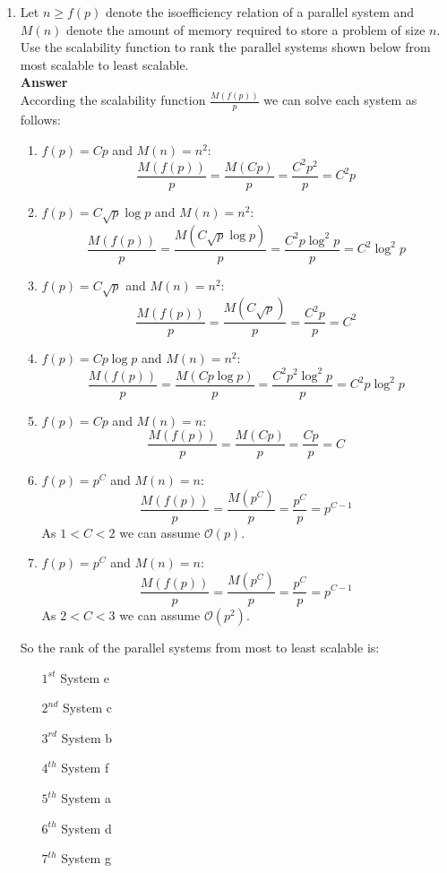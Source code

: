 \documentclass[10pt]{scrartcl}
\begin{document}
\begin{enumerate}
 \item Let $n \geqslant f(p)$ denote the isoefficiency relation of a parallel system and $M(n)$ denote the amount of memory required to store a problem of size $n$. Use the scalability function to rank the parallel systems shown below from most scalable to least scalable.
 \\ 
 \textbf{Answer}
 \\
 According the scalability function $\frac{M(f(p))}{p}$ we can solve each system as follows:
 \begin{enumerate}
  \item $f(p)=Cp$ and $M(n)=n^2$:
  $$\frac{M(f(p))}{p} = \frac{M(Cp)}{p} = \frac{C^2p^2}{p} = C^2p$$
  \item $f(p)=C\sqrt{p}\log{p}$ and $M(n)=n^2$:
  $$\frac{M(f(p))}{p} = \frac{M(C\sqrt{p}\log{p})}{p} = \frac{C^2p\log^2{p}}{p} = C^2\log^2{p}$$
  \item $f(p)=C\sqrt{p}$ and $M(n)=n^2$:
  $$\frac{M(f(p))}{p} = \frac{M(C\sqrt{p})}{p} = \frac{C^2p}{p} = C^2$$
  \item $f(p)=Cp\log{p}$ and $M(n)=n^2$:
  $$\frac{M(f(p))}{p} = \frac{M(Cp\log{p})}{p} = \frac{C^2p^2\log^2{p}}{p} = C^2p\log^2{p}$$
  \item $f(p)=Cp$ and $M(n)=n$:
  $$\frac{M(f(p))}{p} = \frac{M(Cp)}{p} = \frac{Cp}{p} = C$$
  \item $f(p)=p^C$ and $M(n)=n$:
  $$\frac{M(f(p))}{p} = \frac{M(p^C)}{p} = \frac{p^C}{p} = p^{C-1}$$
  As $1 < C < 2$ we can assume $\mathcal{O}(p)$.
  \item $f(p)=p^C$ and $M(n)=n$:
  $$\frac{M(f(p))}{p} = \frac{M(p^C)}{p} = \frac{p^C}{p} = p^{C-1}$$
  As $2 < C < 3$ we can assume $\mathcal{O}(p^2)$.
 \end{enumerate}
 So the rank of the parallel systems from most to least scalable is:
\begin{itemize}
    \item[$1^{st}$] System e
    \item[$2^{nd}$] System c
    \item[$3^{rd}$] System b
    \item[$4^{th}$] System f
    \item[$5^{th}$] System a
    \item[$6^{th}$] System d
    \item[$7^{th}$] System g
\end{itemize}


\end{enumerate}
\end{document}

